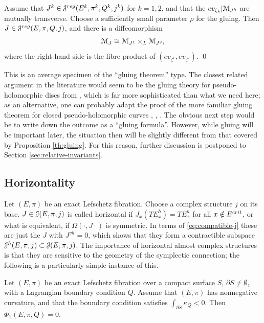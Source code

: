 \documentclass[10pt,letterpaper]{article}
\begin{document}
\begin{proposition} \label{th:gluing}
Assume that $J^k \in \mathcal{J}^{reg}(E^k,\pi^k,Q^k,j^k)$ for $k = 1,2$, and that the
$ev_{\zeta_k} | \mathcal{M}_{J^k}$ are mutually transverse. Choose a sufficiently small
parameter $\rho$ for the gluing. Then $J \in \mathcal{J}^{reg}(E,\pi,Q,j)$, and there is a
diffeomorphism
\[
\mathcal{M}_J \cong \mathcal{M}_{J^1} \times_L \mathcal{M}_{J^2},
\]
where the right hand side is the fibre product of
$(ev_{\zeta^1},ev_{\zeta^2})$. \qed
\end{proposition}

This is an average specimen of the ``gluing theorem'' type. The closest related
argument in the literature would seem to be the gluing theory for
pseudo-holomorphic discs from \cite[Section 18]{fukaya-oh-ohta-ono}, which is
far more sophisticated than what we need here; as an alternative, one can
probably adapt the proof of the more familiar gluing theorem for closed
pseudo-holomorphic curves \cite[Section 6]{ruan-tian94}, \cite[Appendix
A]{mcduff-salamon}, \cite{liu96}. The obvious next step would be to write down
the outcome as a ``gluing formula''. However, while gluing will be important
later, the situation then will be slightly different from that covered by
Proposition \ref{th:gluing}. For this reason, further discussion is postponed
to Section \ref{sec:relative-invariants}.

%

\subsection{Horizontality\label{sec:horizontal}}

Let $(E,\pi)$ be an exact Lefschetz fibration. Choose a complex structure $j$
on its base. $J \in \mathcal{J}(E,\pi,j)$ is called horizontal if $J_x(TE^h_x) =
TE_x^h$ for all $x \notin E^{crit}$, or what is equivalent, if
$\Omega(\cdot,J\cdot)$ is symmetric. In terms of \eqref{eq:compatible-j} these
are just the $J$ with $J^{vh} = 0$, which shows that they form a contractible
subspace $\mathcal{J}^h(E,\pi,j) \subset \mathcal{J}(E,\pi,j)$. The importance of horizontal
almost complex structures is that they are sensitive to the geometry of the
symplectic connection; the following is a particularly simple instance of this.

\begin{lemma} \label{th:first-illu}
Let $(E,\pi)$ be an exact Lefschetz fibration over a compact surface $S$,
$\partial S \neq \emptyset$, with a Lagrangian boundary condition $Q$. Assume
that $(E,\pi)$ has nonnegative curvature, and that the boundary condition
satisfies $\int_{\partial S} \kappa_Q < 0$. Then $\Phi_1(E,\pi,Q) = 0$.
\end{lemma}
\end{document}
